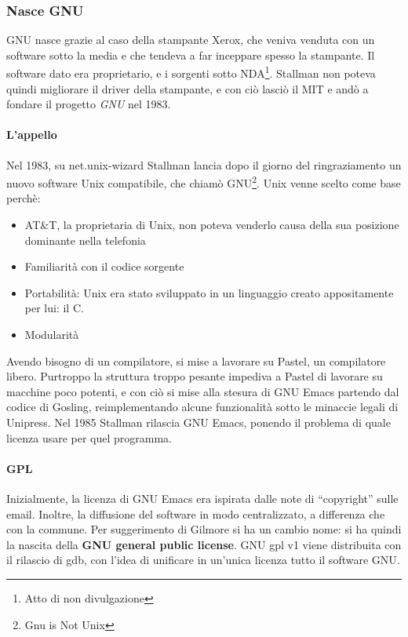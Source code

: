 \subsubsection{Nasce GNU}

GNU nasce grazie al caso della stampante Xerox, che veniva venduta con un software sotto la media e che tendeva a far inceppare spesso la stampante. Il software dato era proprietario, e i sorgenti sotto NDA\footnote{Atto di non divulgazione}. Stallman non poteva quindi migliorare il driver della stampante, e con ci\`o lasci\`o il MIT e and\`o a fondare il progetto \textit{GNU} nel 1983.

\paragraph*{L'appello} Nel 1983, su net.unix-wizard Stallman lancia dopo il giorno del ringraziamento un nuovo software Unix compatibile, che chiam\`o GNU\footnote{Gnu is Not Unix}. Unix venne scelto come base perch\`e:
\begin{itemize}

\item AT\&T, la proprietaria di Unix, non poteva venderlo causa della sua posizione dominante nella telefonia
\item Familiarit\`a con il codice sorgente
\item Portabilit\`a: Unix era stato sviluppato in un linguaggio creato appositamente per lui: il C.
\item Modularit\`a

\end{itemize}

Avendo bisogno di un compilatore, si mise a lavorare su Pastel, un compilatore libero. Purtroppo la struttura troppo pesante impediva a Pastel di lavorare su macchine poco potenti, e con ci\`o si mise alla stesura di GNU Emacs partendo dal codice di Gosling, reimplementando alcune funzionalit\`a sotto le minaccie legali di Unipress. Nel 1985 Stallman rilascia GNU Emacs, ponendo il problema di quale licenza usare per quel programma.

\paragraph*{GPL} Inizialmente, la licenza di GNU Emacs era ispirata dalle note di ``copyright'' sulle email. Inoltre, la diffusione del software in modo centralizzato, a differenza che con la commune. Per suggerimento di Gilmore si ha un cambio nome: si ha quindi la nascita della \textbf{GNU general public license}. GNU gpl v1 viene distribuita con il rilascio di gdb, con l'idea di unificare in un'unica licenza tutto il software GNU.

